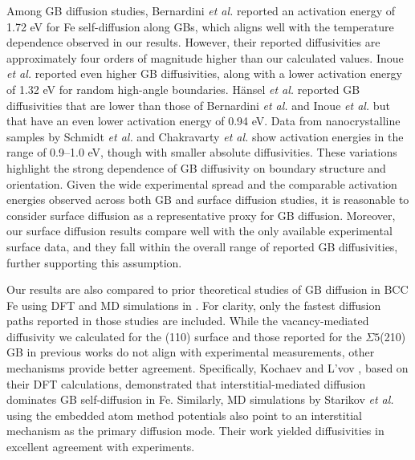 \documentclass[preprint,12pt]{elsarticle}
\begin{document}
Among GB diffusion studies, Bernardini \textit{et al.} \cite{bernardini1982role} reported an activation energy of 1.72 eV for Fe self-diffusion along GBs, which aligns well with the temperature dependence observed in our results. However, their reported diffusivities are approximately four orders of magnitude higher than our calculated values. 
Inoue \textit{et al.} \cite{inoue2007grain} reported even higher GB diffusivities, along with a lower activation energy of 1.32 eV for random high-angle boundaries. 
H\"{a}nsel \textit{et al.} \cite{hansel1985effects} reported GB diffusivities that are lower than those of Bernardini \textit{et al.} \cite{bernardini1982role} and Inoue \textit{et al. }\cite{inoue2007grain} but that have an even lower activation energy of 0.94 eV.
Data from nanocrystalline samples by Schmidt \textit{et al.} \cite{schmidt2012grain} and Chakravarty \textit{et al.} \cite{chakravarty2009self} show activation energies in the range of 0.9–1.0 eV, though with smaller absolute diffusivities.
These variations highlight the strong dependence of GB diffusivity on boundary structure and orientation.
Given the wide experimental spread and the comparable activation energies observed across both GB and surface diffusion studies, it is reasonable to consider surface diffusion as a representative proxy for GB diffusion. Moreover, our surface diffusion results compare well with the only available experimental surface data, and they fall within the overall range of reported GB diffusivities, further supporting this assumption.




Our results are also compared to prior theoretical studies of GB diffusion in BCC Fe using DFT \cite{kochaev_anisotropic_2023} and MD simulations \cite{starikov2020study} in . For clarity, only the fastest diffusion paths reported in those studies are included. While the vacancy-mediated diffusivity we calculated for the (110) surface and those reported for the $\Sigma5$(210) GB in previous works do not align with experimental measurements, other mechanisms provide better agreement. Specifically, Kochaev and L’vov \cite{kochaev_anisotropic_2023}, based on their DFT calculations, demonstrated that interstitial-mediated diffusion dominates GB self-diffusion in Fe. Similarly, MD simulations by Starikov \textit{et al.} \cite{starikov2020study} using the embedded atom method potentials also point to an interstitial mechanism as the primary diffusion mode. Their work yielded diffusivities in excellent agreement with experiments.
\end{document}
